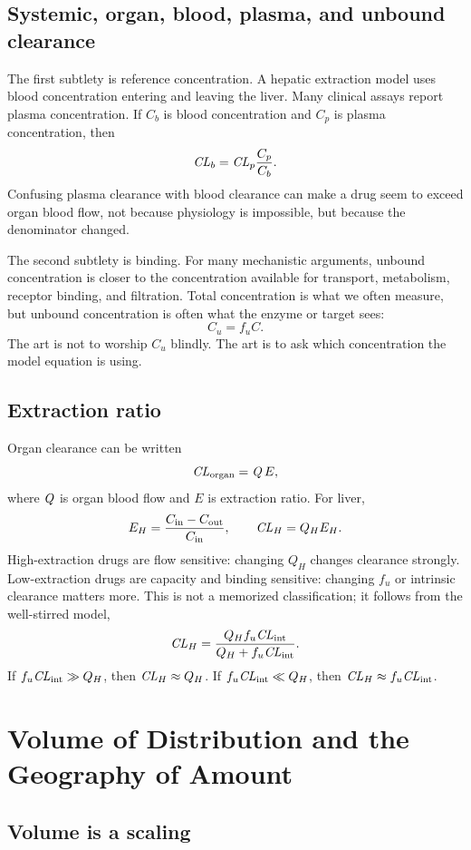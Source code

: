 \documentclass[a4paper]{article}
\newcommand{\pkCL}{\pksym{CL}}
\newcommand{\pkQ}{\pksym{Q}}
\begin{document}
\subsection{Systemic, organ, blood, plasma, and unbound clearance}

The first subtlety is reference concentration. A hepatic extraction model uses blood concentration entering and leaving the liver. Many clinical assays report plasma concentration. If \(C_b\) is blood concentration and \(C_p\) is plasma concentration, then
\[
  \pkCL_b = \pkCL_p\frac{C_p}{C_b}.
\]
Confusing plasma clearance with blood clearance can make a drug seem to exceed organ blood flow, not because physiology is impossible, but because the denominator changed.

The second subtlety is binding. For many mechanistic arguments, unbound concentration is closer to the concentration available for transport, metabolism, receptor binding, and filtration. Total concentration is what we often measure, but unbound concentration is often what the enzyme or target sees:
\[
  C_u=f_u C.
\]
The art is not to worship \(C_u\) blindly. The art is to ask which concentration the model equation is using.

\subsection{Extraction ratio}

Organ clearance can be written
\[
  \pkCL_{\pklab{organ}}=\pkQ\,E,
\]
where \(\pkQ\) is organ blood flow and \(E\) is extraction ratio. For liver,
\[
  E_H=\frac{C_{\pklab{in}}-C_{\pklab{out}}}{C_{\pklab{in}}},
  \qquad
  \pkCL_H=Q_H E_H.
\]
High-extraction drugs are flow sensitive: changing \(Q_H\) changes clearance strongly. Low-extraction drugs are capacity and binding sensitive: changing \(f_u\) or intrinsic clearance matters more. This is not a memorized classification; it follows from the well-stirred model,
\[
  \pkCL_H=\frac{Q_H f_u \pkCL_{\pklab{int}}}{Q_H+f_u \pkCL_{\pklab{int}}}.
\]
If \(f_u\pkCL_{\pklab{int}}\gg Q_H\), then \(\pkCL_H\approx Q_H\). If \(f_u\pkCL_{\pklab{int}}\ll Q_H\), then \(\pkCL_H\approx f_u\pkCL_{\pklab{int}}\).

\section{Volume of Distribution and the Geography of Amount}

\subsection{Volume is a scaling}
\end{document}
